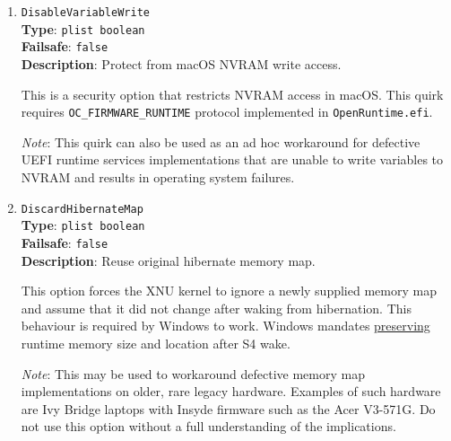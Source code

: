 \documentclass[]{article}
\begin{document}
\begin{enumerate}
  This is a security option that restricts the activation of single user mode
  by ignoring the \texttt{CMD+S} hotkey and the \texttt{-s} boot argument. The
  behaviour with this quirk enabled is supposed to match T2-based model behaviour.
  Refer to this
  \href{https://web.archive.org/web/20200517125051/https://support.apple.com/en-us/HT201573}{archived article}
  to understand how to use single user mode with this quirk enabled.

  \emph{Note}: When Apple Secure Boot is enabled single user mode is always disabled.

\item
  \texttt{DisableVariableWrite}\\
  \textbf{Type}: \texttt{plist\ boolean}\\
  \textbf{Failsafe}: \texttt{false}\\
  \textbf{Description}: Protect from macOS NVRAM write access.

  This is a security option that restricts NVRAM access in macOS.
  This quirk requires \texttt{OC\_FIRMWARE\_RUNTIME} protocol implemented
  in \texttt{OpenRuntime.efi}.

  \emph{Note}: This quirk can also be used as an ad hoc workaround for defective UEFI
  runtime services implementations that are unable to write variables to NVRAM
  and results in operating system failures.

\item
  \texttt{DiscardHibernateMap}\\
  \textbf{Type}: \texttt{plist\ boolean}\\
  \textbf{Failsafe}: \texttt{false}\\
  \textbf{Description}: Reuse original hibernate memory map.

  This option forces the XNU kernel to ignore a newly supplied memory map and assume
  that it did not change after waking from hibernation. This behaviour is required by
   Windows to work. Windows mandates
  \href{https://docs.microsoft.com/en-us/windows-hardware/design/device-experiences/oem-uefi#hibernation-state-s4-transition-requirements}{preserving}
  runtime memory size and location after S4 wake.

  \emph{Note}: This may be used to workaround defective memory map implementations on older,
  rare legacy hardware. Examples of such hardware are Ivy Bridge laptops with Insyde firmware
  such as the Acer V3-571G. Do not use this option without a full understanding of the implications.


\end{enumerate}
\end{document}

